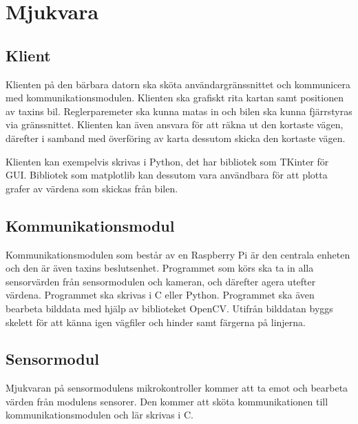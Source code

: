 \documentclass[systemskiss/skiss.tex]{subfiles}
\begin{document}
\section{Mjukvara}
\subsection{Klient}
Klienten på den bärbara datorn ska sköta användargränssnittet och kommunicera
med kommunikationsmodulen. Klienten ska grafiskt rita kartan samt positionen av
taxins bil. Reglerparemeter ska kunna matas in och bilen ska kunna fjärrstyras
via gränssnittet. Klienten kan även ansvara för att räkna ut den kortaste
vägen, därefter i samband med överföring av karta dessutom skicka den kortaste
vägen.

Klienten kan exempelvis skrivas i Python, det har bibliotek som TKinter för
GUI. Bibliotek som matplotlib kan dessutom vara användbara för att plotta
grafer av värdena som skickas från bilen.

\subsection{Kommunikationsmodul}
Kommunikationsmodulen som består av en Raspberry Pi är den centrala enheten och
den är även taxins beslutsenhet. Programmet som körs ska ta in alla
sensorvärden från sensormodulen och kameran, och därefter agera utefter
värdena. Programmet ska skrivas i C eller Python. Programmet ska även bearbeta
bilddata med hjälp av biblioteket OpenCV. Utifrån bilddatan byggs skelett för
att känna igen vägfiler och hinder samt färgerna på linjerna.

\subsection{Sensormodul}
Mjukvaran på sensormodulens mikrokontroller kommer att ta emot och bearbeta
värden från modulens sensorer. Den kommer att sköta kommunikationen till
kommunikationsmodulen och lär skrivas i C.
\end{document}
